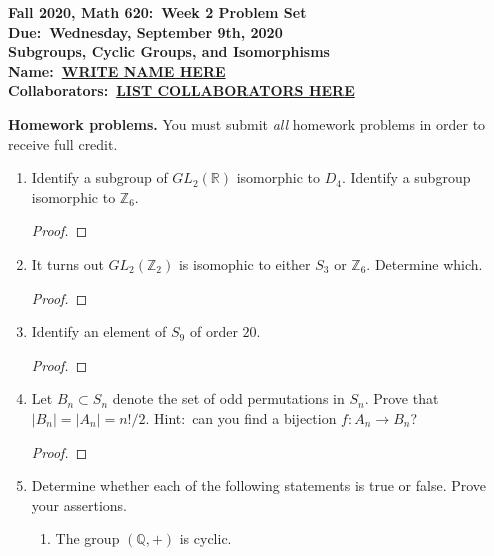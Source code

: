 \documentclass{article}
\theoremstyle{definition}
\numberwithin{equation}{section}
\newcommand{\ring}[1]{\ensuremath{\mathbb{#1}}}
\renewcommand\>{\rangle}
\newcommand\<{\langle}
\newcommand\0{\mathbf{0}}
\newcommand\QQ{\ring{Q}}
\newcommand\RR{\ring{R}}
\newcommand\ZZ{\ring{Z}}
\begin{document}
\begin{center}
\textbf{Fall 2020, Math 620:\ Week 2 Problem Set} \\
\textbf{Due:\ Wednesday, September 9th, 2020} \\
\textbf{Subgroups, Cyclic Groups, and Isomorphisms} \\
\textbf{Name:\ \underline{WRITE NAME HERE}} \\
\textbf{Collaborators:\ \underline{LIST COLLABORATORS HERE}}
\end{center}


\bigskip
\noindent
\textbf{Homework problems.}
You must submit \emph{all} homework problems in order to receive full credit.  

\begin{enumerate}[(H1)]
\item 
Identify a subgroup of $GL_2(\RR)$ isomorphic to $D_4$.  Identify a subgroup isomorphic to $\ZZ_6$.  

\begin{proof}

\end{proof}


\item 
It turns out $GL_2(\ZZ_2)$ is isomophic to either $S_3$ or $\ZZ_6$.  Determine which.  

\begin{proof}

\end{proof}


\item 
Identify an element of $S_9$ of order $20$.  

\begin{proof}

\end{proof}


\item 
Let $B_n \subset S_n$ denote the set of odd permutations in $S_n$.  Prove that $|B_n| = |A_n| = n!/2$.  Hint:\ can you find a bijection $f:A_n \to B_n$?  

\begin{proof}

\end{proof}


\item 
Determine whether each of the following statements is true or false.  Prove your assertions.  

\begin{enumerate}
\item 
The group $(\QQ, +)$ is cyclic.  


\end{enumerate}
\end{enumerate}
\end{document}
